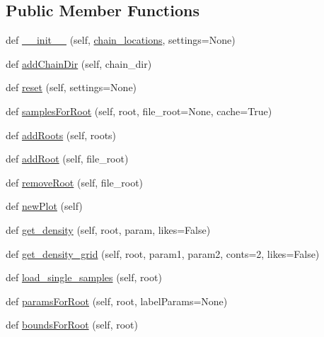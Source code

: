 \subsection*{Public Member Functions}
\begin{DoxyCompactItemize}
\item 
def \mbox{\hyperlink{classgetdist_1_1plots_1_1MCSampleAnalysis_a85dad878c7c3532d966f0d46188a8ab1}{\+\_\+\+\_\+init\+\_\+\+\_\+}} (self, \mbox{\hyperlink{classgetdist_1_1plots_1_1MCSampleAnalysis_a23dbb7ae143679e678d0c82f2411d51e}{chain\+\_\+locations}}, settings=None)
\item 
def \mbox{\hyperlink{classgetdist_1_1plots_1_1MCSampleAnalysis_aa2dc5aeed2c014c5ffee3dfc92850ae9}{add\+Chain\+Dir}} (self, chain\+\_\+dir)
\item 
def \mbox{\hyperlink{classgetdist_1_1plots_1_1MCSampleAnalysis_aecba5996a9bd7571a2886360e9458cfe}{reset}} (self, settings=None)
\item 
def \mbox{\hyperlink{classgetdist_1_1plots_1_1MCSampleAnalysis_a81c2af5210ee710151a4ea852312999c}{samples\+For\+Root}} (self, root, file\+\_\+root=None, cache=True)
\item 
def \mbox{\hyperlink{classgetdist_1_1plots_1_1MCSampleAnalysis_adfcdd2464aa89d7c72dbf8f4bf0a04ae}{add\+Roots}} (self, roots)
\item 
def \mbox{\hyperlink{classgetdist_1_1plots_1_1MCSampleAnalysis_a66016ce12ceb418f0bdf2717f272e57a}{add\+Root}} (self, file\+\_\+root)
\item 
def \mbox{\hyperlink{classgetdist_1_1plots_1_1MCSampleAnalysis_aed1d592770a9f8dbd55af844bb55234e}{remove\+Root}} (self, file\+\_\+root)
\item 
def \mbox{\hyperlink{classgetdist_1_1plots_1_1MCSampleAnalysis_a46a583be508db9c57da6afe4766a4279}{new\+Plot}} (self)
\item 
def \mbox{\hyperlink{classgetdist_1_1plots_1_1MCSampleAnalysis_a84058dd5a8abce27dbe67c1a9544b139}{get\+\_\+density}} (self, root, param, likes=False)
\item 
def \mbox{\hyperlink{classgetdist_1_1plots_1_1MCSampleAnalysis_a03533aa69a7cfeddba8e641b36b6025d}{get\+\_\+density\+\_\+grid}} (self, root, param1, param2, conts=2, likes=False)
\item 
def \mbox{\hyperlink{classgetdist_1_1plots_1_1MCSampleAnalysis_a993420585e2d3d9625272366173756cf}{load\+\_\+single\+\_\+samples}} (self, root)
\item 
def \mbox{\hyperlink{classgetdist_1_1plots_1_1MCSampleAnalysis_ad38551dc8499923e02dd925ab2a0e6cf}{params\+For\+Root}} (self, root, label\+Params=None)
\item 
def \mbox{\hyperlink{classgetdist_1_1plots_1_1MCSampleAnalysis_a73bb61d8e16c40ed2be4728f8cca5515}{bounds\+For\+Root}} (self, root)
\end{DoxyCompactItemize}

